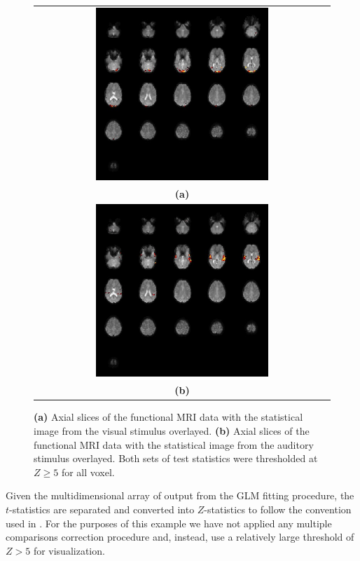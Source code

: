 \documentclass[
]{article}
\begin{document}
\begin{figure}[tbp]
  \begin{center}
    \begin{tabular}{c}
      \includegraphics*[width=0.6\textwidth]{ffd_zstat1.jpeg}\\
      \textbf{(a)}\\
      \includegraphics*[width=0.6\textwidth]{ffd_zstat2.jpeg}\\
      \textbf{(b)}
    \end{tabular}
  \end{center}
  \caption{\textbf{(a)} Axial slices of the functional MRI data with
    the statistical image from the visual stimulus overlayed.
    \textbf{(b)} Axial slices of the functional MRI data with the
    statistical image from the auditory stimulus overlayed.  Both sets
    of test statistics were thresholded at $Z\geq{5}$ for all voxel.}
  \label{fig:zstat1+zstat2}
\end{figure}

Given the multidimensional array of output from the GLM fitting
procedure, the \(t\)-statistics are separated and converted into
\(Z\)-statistics to follow the convention used in . For the
purposes of this example we have not applied any multiple comparisons
correction procedure and, instead, use a relatively large threshold of
\(Z>5\) for visualization.
\end{document}
